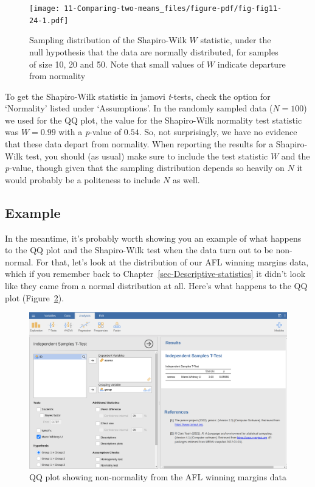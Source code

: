 \documentclass[
  a4paper,
]{book}
\begin{document}
\begin{figure}

\texttt{[image: 11-Comparing-two-means\_files/figure-pdf/fig-fig11-24-1.pdf]} \hfill{}

\caption{\label{fig-fig11-24}Sampling distribution of the Shapiro-Wilk
\(W\) statistic, under the null hypothesis that the data are normally
distributed, for samples of size 10, 20 and 50. Note that small values
of \(W\) indicate departure from normality}

\end{figure}

To get the Shapiro-Wilk statistic in jamovi \emph{t}-tests, check the
option for `Normality' listed under `Assumptions'. In the randomly
sampled data (\(N = 100\)) we used for the QQ plot, the value for the
Shapiro-Wilk normality test statistic was \(W = 0.99\) with a
\emph{p}-value of \(0.54\). So, not surprisingly, we have no evidence
that these data depart from normality. When reporting the results for a
Shapiro-Wilk test, you should (as usual) make sure to include the test
statistic \(W\) and the \emph{p}-value, though given that the sampling
distribution depends so heavily on \(N\) it would probably be a
politeness to include \(N\) as well.

\hypertarget{example}{%
\subsection{Example}\label{example}}

In the meantime, it's probably worth showing you an example of what
happens to the QQ plot and the Shapiro-Wilk test when the data turn out
to be non-normal. For that, let's look at the distribution of our AFL
winning margins data, which if you remember back to
Chapter~\ref{sec-Descriptive-statistics} it didn't look like they came
from a normal distribution at all. Here's what happens to the QQ plot
(Figure~\ref{fig-fig11-25}).

\begin{figure}

\includegraphics[width=1\textwidth,height=\textheight]{images/fig11-25.png} \hfill{}

\caption{\label{fig-fig11-25}QQ plot showing non-normality from the AFL
winning margins data}

\end{figure}
\end{document}
